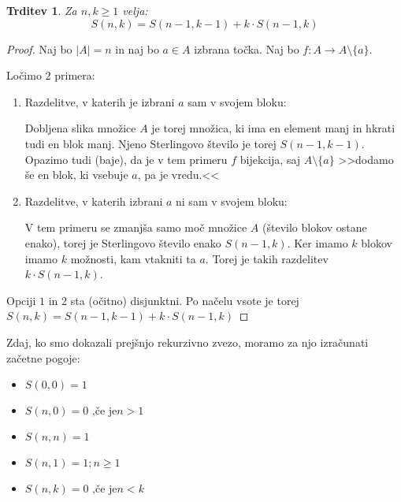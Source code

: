 \documentclass[a4paper, 10pt]{article}
\newtheorem{trditev}{Trditev}
\newcommand{\abs}[1]{\ensuremath{\lvert #1 \rvert}}
\begin{document}
\begin{trditev}
Za $n, k \geq 1$ velja:
\[
S(n, k) = S(n - 1, k - 1) + k \cdot S(n - 1, k)
\]
\end{trditev}

\begin{proof}
Naj bo $\abs{A} = n$ in naj bo $a \in A$ izbrana točka.
Naj bo $f: A \rightarrow A\setminus \{a\}$.

Ločimo $2$ primera:

\begin{enumerate}

\item Razdelitve, v katerih je izbrani $a$ sam v svojem bloku:

Dobljena slika množice $A$ je torej množica, ki ima en element manj in hkrati tudi en blok manj. Njeno Sterlingovo število je torej $S(n - 1, k - 1)$. Opazimo tudi (baje), da je v tem primeru $f$ bijekcija, saj $A\setminus \{a\}$ >>dodamo še en blok, ki vsebuje $a$, pa je vredu.<<

\item Razdelitve, v katerih izbrani $a$ ni sam v svojem bloku:

V tem primeru se zmanjša samo moč množice $A$ (število blokov ostane enako), torej je Sterlingovo število enako $S(n - 1, k)$.
Ker imamo $k$ blokov imamo $k$ možnosti, kam vtakniti ta $a$. Torej je takih razdelitev $k \cdot S(n - 1, k)$.
 
\end{enumerate}
Opciji $1$ in $2$ sta (očitno) disjunktni. Po načelu vsote je torej $S(n, k) = S(n - 1, k - 1) + k \cdot S(n - 1, k)$
\end{proof}
Zdaj, ko smo dokazali prejšnjo rekurzivno zvezo, moramo za njo izračunati začetne pogoje:
\begin{itemize}

\item $S(0,0) = 1$
\item $S(n,0) = 0 \text{~,če je} n > 1 $
\item $S(n, n) = 1$
\item $S(n, 1) = 1; n \geq 1$
\item $S(n, k) = 0 \text{~,če je} n < k$

\end{itemize}
\end{document}
